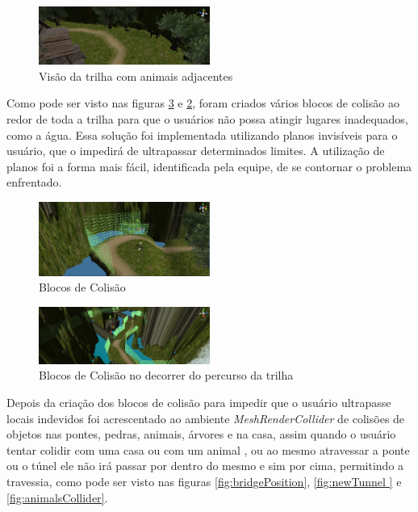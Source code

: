 \begin{figure}[h]
  \centering
  \includegraphics[width=0.5\textwidth]{figuras/animaisPista}
  \caption{Visão da trilha com animais adjacentes}
  \label{fig:animaisPista}
\end{figure}

Como pode ser visto nas figuras \ref{fig:blocosPercurso} e \ref{fig:blocosColisao}, foram criados vários blocos de colisão ao redor de toda a trilha para que o usuários não possa atingir lugares inadequados, como a água. Essa solução foi implementada utilizando planos invisíveis para o usuário, que o impedirá de ultrapassar determinados limites. A utilização de planos foi a forma mais fácil, identificada pela equipe, de se contornar o problema enfrentado.

\begin{figure}[h]
  \centering
  \includegraphics[width=0.5\textwidth]{figuras/blocosColisao}
  \caption{Blocos de Colisão}
  \label{fig:blocosColisao}
\end{figure}

\begin{figure}[h]
  \centering
  \includegraphics[width=0.5\textwidth]{figuras/blocosPercurso}
  \caption{Blocos de Colisão no decorrer do percurso da trilha}
  \label{fig:blocosPercurso}
\end{figure}

Depois da criação dos blocos de colisão para impedir que o usuário ultrapasse locais indevidos foi acrescentado ao ambiente \textit{ MeshRenderCollider } de colisões de objetos nas pontes, pedras, animais, árvores e na casa, assim quando o usuário tentar colidir com uma casa ou com um animal , ou ao mesmo atravessar a ponte ou o túnel ele não irá passar por dentro do mesmo e sim por cima, permitindo a travessia, como pode ser visto nas figuras \ref{fig:bridgePosition}, \ref{fig:newTunnel
} e \ref{fig:animalsCollider}.

